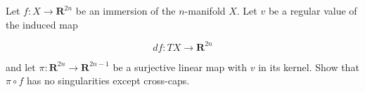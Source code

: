 Let $f: X \to \mathbf{R}^{2n}$ be an immersion of the $n$-manifold $X$. Let $v$ be a regular value of the induced map

$$
df: TX \to \mathbf{R}^{2n}
$$

and let $\pi: \mathbf{R}^{2n} \to \mathbf{R}^{2n-1}$ be a surjective linear map with $v$ in its kernel. Show that $\pi \circ f$ has no singularities except cross-caps.
